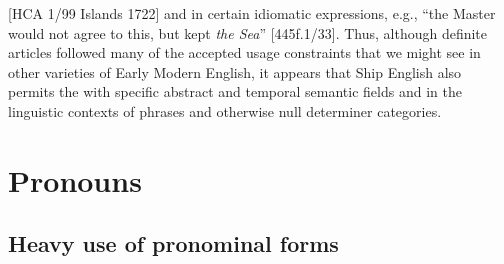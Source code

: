 [HCA 1/99  Islands 1722] and in certain idiomatic expressions, e.g., “the Master would not agree to this, but kept \textit{the Sea}” [445f.1/33]. Thus, although definite articles followed many of the accepted usage constraints that we might see in other varieties of Early Modern English, it appears that Ship English also permits the  with specific abstract and temporal semantic fields and in the linguistic contexts of  phrases and otherwise null determiner categories. 

\section{{Pronouns}}\label{sec:5.4}

\subsection{{Heavy use of pronominal forms}}\label{sec:5.4.1}

